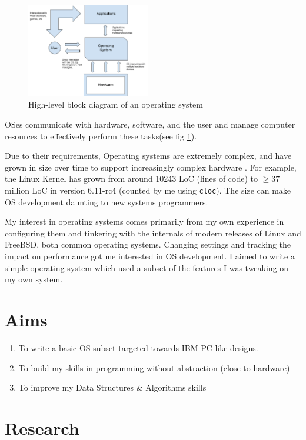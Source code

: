 \documentclass[a4paper,12pt]{article}
\begin{document}
\begin{figure}
\includegraphics[width=0.48\textwidth]{osschematic}
\caption{High-level block diagram of an operating system} 
\label{fig:osschematic}
\end{figure}

OSes communicate with hardware, software, and the user and manage computer resources to effectively perform these tasks(see fig \ref{fig:osschematic}).

Due to their requirements, Operating systems are extremely complex, and have grown in size over time to support increasingly complex hardware . For example, the Linux Kernel has grown from around 10243 LoC (lines of code) to $\geq 37$ million LoC in version 6.11-rc4 (counted by me using \texttt{cloc}). The size can make OS development daunting to new systems programmers. 

My interest in operating systems comes primarily from my own experience in configuring them and tinkering with the internals of modern releases of Linux and FreeBSD, both common operating systems. Changing settings and tracking the impact on performance got me interested in OS development. I aimed to write a simple operating system which used a subset of the features I was tweaking on my own system. 
\section{Aims} 
\begin{enumerate}
\item To write a basic OS subset targeted towards IBM PC-like designs.
\item To build my skills in programming without abstraction (close to hardware)
\item To improve my Data Structures \& Algorithms skills 
\end{enumerate}
\section{Research} 
\end{document}
